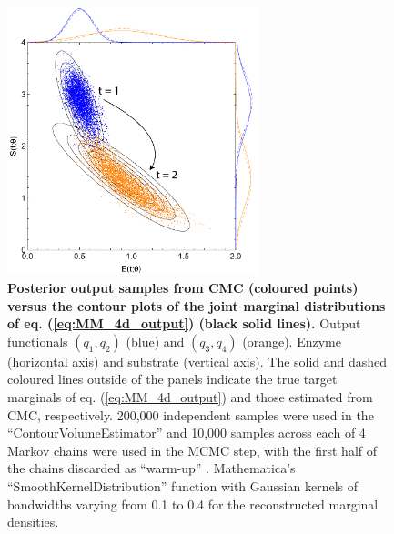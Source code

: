 \begin{figure}[H]
\centerline{\includegraphics[width=0.65\textwidth]{../figures/mm_4d_outputs.pdf}}
\caption{\textbf{Posterior output samples from CMC (coloured points) versus the contour plots of the joint marginal distributions of eq. (\ref{eq:MM_4d_output}) (black solid lines).} Output functionals $(q_1,q_2)$ (blue) and $(q_3,q_4)$ (orange). Enzyme (horizontal axis) and substrate (vertical axis). The solid and dashed coloured lines outside of the panels indicate the true target marginals of eq. (\ref{eq:MM_4d_output}) and those estimated from CMC, respectively. %
200,000 independent samples were used in the ``ContourVolumeEstimator'' and 10,000 samples across each of 4 Markov chains were used in the MCMC step, with the first half of the chains discarded as ``warm-up'' \cite{lambert2018Student}. Mathematica's ``SmoothKernelDistribution'' function with Gaussian kernels \cite{mathematica} of bandwidths varying from 0.1 to 0.4 for the reconstructed marginal densities.}
\label{fig:mm_4d_outputs}
\end{figure}


